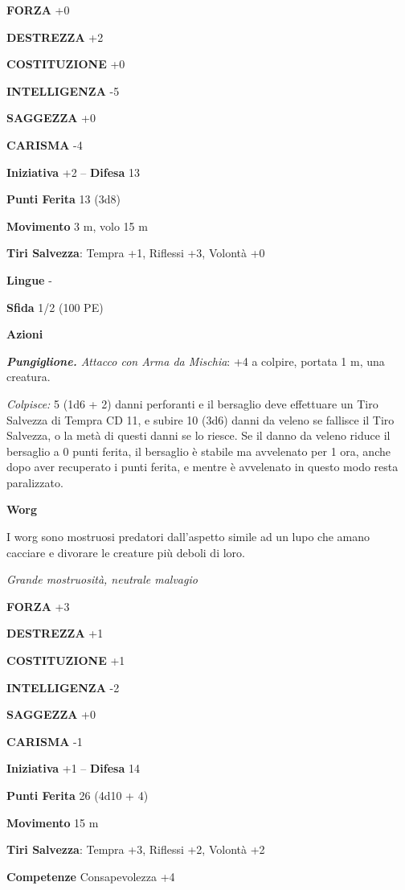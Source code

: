 \begin{multicols}{2}
\textbf{FORZA} +0

\textbf{DESTREZZA} +2

\textbf{COSTITUZIONE} +0

\textbf{INTELLIGENZA} -5

\textbf{SAGGEZZA} +0

\textbf{CARISMA} -4

\textbf{Iniziativa} +2 -- \textbf{Difesa} 13

\textbf{Punti Ferita} 13 (3d8)

\textbf{Movimento} 3 m, volo 15 m

\textbf{Tiri Salvezza}: Tempra +1, Riflessi +3, Volontà +0 

\textbf{Lingue} -

\textbf{Sfida} 1/2 (100 PE)

\textbf{Azioni}

\emph{\textbf{Pungiglione.} Attacco con Arma da Mischia}: +4 a colpire, portata 1 m, una creatura.

\emph{Colpisce:} 5 (1d6 + 2) danni perforanti e il bersaglio deve effettuare un Tiro Salvezza di Tempra CD 11, e subire 10 (3d6) danni da veleno se fallisce il Tiro Salvezza, o la metà di questi danni se lo riesce. Se il danno da veleno riduce il bersaglio a 0 punti ferita, il bersaglio è stabile ma avvelenato per 1 ora, anche dopo aver recuperato i punti ferita, e mentre è avvelenato in questo modo resta paralizzato.

\medskip\textbf{Worg}

I worg sono mostruosi predatori dall'aspetto simile ad un lupo che amano cacciare e divorare le creature più deboli di loro.

\emph{Grande mostruosità, neutrale malvagio}

\textbf{FORZA} +3

\textbf{DESTREZZA} +1

\textbf{COSTITUZIONE} +1

\textbf{INTELLIGENZA} -2

\textbf{SAGGEZZA} +0

\textbf{CARISMA} -1

\textbf{Iniziativa} +1 -- \textbf{Difesa} 14

\textbf{Punti Ferita} 26 (4d10 + 4)

\textbf{Movimento} 15 m

\textbf{Tiri Salvezza}: Tempra +3, Riflessi +2, Volontà +2 

\textbf{Competenze} Consapevolezza +4


\end{multicols}
